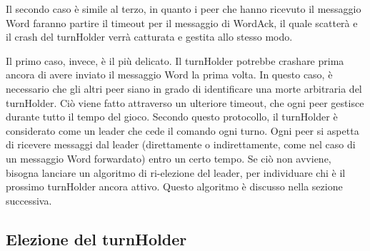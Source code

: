 \documentclass[10.5pt]{article}
\begin{document}
Il secondo caso è simile al terzo, in quanto i peer che hanno ricevuto il messaggio Word faranno partire il timeout per il messaggio di WordAck, il quale scatterà e il crash del turnHolder verrà catturata e gestita allo stesso modo.

Il primo caso, invece, è il più delicato. Il turnHolder potrebbe crashare prima ancora di avere inviato il messaggio Word la prima volta. In questo caso, è necessario che gli altri peer siano in grado di identificare una morte arbitraria del turnHolder. Ciò viene fatto attraverso un ulteriore timeout, che ogni peer gestisce durante tutto il tempo del gioco. Secondo questo protocollo, il turnHolder è considerato come un leader che cede il comando ogni turno. Ogni peer si aspetta di ricevere messaggi dal leader (direttamente o indirettamente, come nel caso di un messaggio Word forwardato) entro un certo tempo. Se ciò non avviene, bisogna lanciare un algoritmo di ri-elezione del leader, per individuare chi è il prossimo turnHolder ancora attivo. Questo algoritmo è discusso nella sezione successiva.



\subsection{Elezione del turnHolder}







\end{document}
